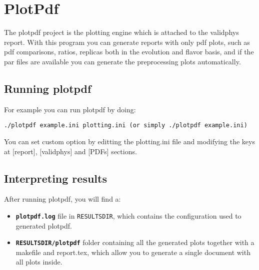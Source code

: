 
\section{PlotPdf}

The plotpdf project is the plotting engine which is attached to the validphys report. With this program you can generate reports with only pdf plots, such as pdf comparisons, ratios, replicas both in the evolution and flavor basis, and if the par files are available you can generate the preprocessing plots automatically.

\subsection{Running plotpdf}

For example you can run plotpdf by doing:

\begin{lstlisting}
./plotpdf example.ini plotting.ini (or simply ./plotpdf example.ini)
\end{lstlisting}

You can set custom option by editting the plotting.ini file and modifying the keys at [report], [validphys] and [PDFs] sections.

\subsection{Interpreting results}

After running plotpdf, you will find a:
\begin{itemize}
\item \texttt{\textbf{plotpdf.log}} file in \texttt{RESULTSDIR}, which contains
the configuration used to generated plotpdf. 
\item \texttt{\textbf{RESULTSDIR/plotpdf}} folder containing all the generated plots together with a makefile and report.tex, which allow you to generate a single document with all plots inside. 
\end{itemize}
